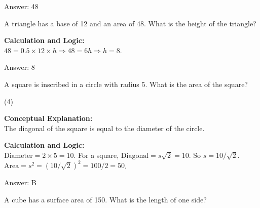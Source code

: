 \documentclass[11pt,paper=a4,answers]{exam}
\begin{document}
\begin{questions}
\begin{solution}
\vspace{30pt}

Answer: \colorbox{yellow!100}{48}
\end{solution}

\vspace{60pt}

\question
A triangle has a base of 12 and an area of 48. What is the height of the triangle?

\begin{solution}
\textbf{Calculation and Logic:} \\
$48 = 0.5 \times 12 \times h \Rightarrow 48 = 6h \Rightarrow h = 8$.

\vspace{30pt}

Answer: \colorbox{yellow!100}{8}
\end{solution}

\vspace{60pt}

\question
A square is inscribed in a circle with radius 5. What is the area of the square?
\begin{tasks}(4)
\end{tasks}

\begin{solution}
\textbf{Conceptual Explanation:} \\
The diagonal of the square is equal to the diameter of the circle.

\vspace{30pt}

\textbf{Calculation and Logic:} \\
$\text{Diameter} = 2 \times 5 = 10$. For a square, $\text{Diagonal} = s\sqrt{2} = 10$. So $s = 10/\sqrt{2}$. $\text{Area} = s^2 = (10/\sqrt{2})^2 = 100/2 = 50$.

\vspace{30pt}

Answer: \colorbox{yellow!100}{B}
\end{solution}

\vspace{60pt}

\question
A cube has a surface area of 150. What is the length of one side?


\end{questions}
\end{document}

